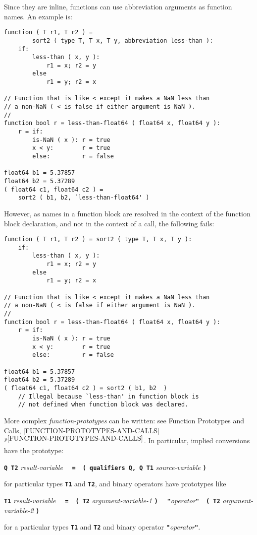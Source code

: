 \documentclass[12pt]{article}
\newcommand{\TT}[1]{{\tt \bfseries #1}}
\newcommand{\itemref}[1]{\ref{#1}$^{p\pageref{#1}}$}
\newenvironment{indpar}[1][0.3in]%
	{\begin{list}{}%
		     {\setlength{\itemsep}{0in}%
		      \setlength{\topsep}{0in}%
		      \setlength{\parsep}{1ex}%
		      \setlength{\labelwidth}{#1}%
		      \setlength{\leftmargin}{#1}%
		      \addtolength{\leftmargin}{\labelsep}}%
	 \item}%
	{\end{list}}
\begin{document}
Since they are inline, functions can use abbreviation arguments as function
names.  An example is:
\begin{indpar}\begin{verbatim}
function ( T r1, T r2 ) =
        sort2 ( type T, T x, T y, abbreviation less-than ):
    if:
        less-than ( x, y ):
            r1 = x; r2 = y
        else
            r1 = y; r2 = x

// Function that is like < except it makes a NaN less than
// a non-NaN ( < is false if either argument is NaN ).
//
function bool r = less-than-float64 ( float64 x, float64 y ):
    r = if:
        is-NaN ( x ): r = true
        x < y:        r = true
        else:         r = false

float64 b1 = 5.37857
float64 b2 = 5.37289
( float64 c1, float64 c2 ) =
    sort2 ( b1, b2, `less-than-float64' )
\end{verbatim}\end{indpar}

However, as names in a function block are resolved in the context
of the function block declaration, and not in the context of a
call, the following fails:
\begin{indpar}\begin{verbatim}
function ( T r1, T r2 ) = sort2 ( type T, T x, T y ):
    if:
        less-than ( x, y ):
            r1 = x; r2 = y
        else
            r1 = y; r2 = x

// Function that is like < except it makes a NaN less than
// a non-NaN ( < is false if either argument is NaN ).
//
function bool r = less-than-float64 ( float64 x, float64 y ):
    r = if:
        is-NaN ( x ): r = true
        x < y:        r = true
        else:         r = false

float64 b1 = 5.37857
float64 b2 = 5.37289
( float64 c1, float64 c2 ) = sort2 ( b1, b2  )
    // Illegal because `less-than' in function block is
    // not defined when function block was declared.
\end{verbatim}\end{indpar}

More complex {\em function-prototypes} can be written:
see Function Prototypes and Calls, \itemref{FUNCTION-PROTOTYPES-AND-CALLS}.
In particular, implied conversions have the prototype:
\begin{center}
\TT{Q T2} {\em result-variable}%
    ~~\TT{=}~~\TT{( qualifiers Q, Q T1} {\em source-variable} \TT{)}
\end{center}
for particular types \TT{T1} and \TT{T2}, and binary operators have prototypes
like
\begin{center}
\TT{T1} {\em result-variable}%
    ~~\TT{=}~~\TT{( T2} {\em argument-variable-1} \TT{)}
    ~~\TT{"}{\em operator}\TT{"}~~\TT{( T2} {\em argument-variable-2} \TT{)}
\end{center}
for a particular types \TT{T1} and \TT{T2}
and binary operator \TT{"}{\em operator}\TT{"}.
\end{document}
